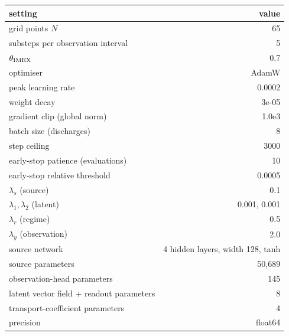 \begin{tabular}{lr}
\toprule
setting & value \\
\midrule
grid points $N$ & 65 \\
substeps per observation interval & 5 \\
$\theta_{\mathrm{IMEX}}$ & 0.7 \\
optimiser & AdamW \\
peak learning rate & 0.0002 \\
weight decay & 3e-05 \\
gradient clip (global norm) & 1.0e3 \\
batch size (discharges) & 8 \\
step ceiling & 3000 \\
early-stop patience (evaluations) & 10 \\
early-stop relative threshold & 0.0005 \\
$\lambda_s$ (source) & 0.1 \\
$\lambda_1,\lambda_2$ (latent) & 0.001, 0.001 \\
$\lambda_r$ (regime) & 0.5 \\
$\lambda_y$ (observation) & 2.0 \\
source network & 4 hidden layers, width 128, tanh \\
source parameters & 50,689 \\
observation-head parameters & 145 \\
latent vector field + readout parameters & 8 \\
transport-coefficient parameters & 4 \\
precision & float64 \\
\bottomrule
\end{tabular}